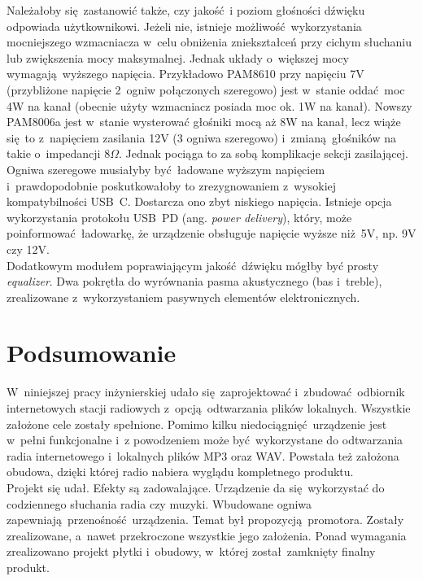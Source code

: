 \documentclass[polish]{aghengthesis}
\begin{document}
			Należałoby się zastanowić także, czy jakość i poziom głośności dźwięku odpowiada użytkownikowi. Jeżeli nie, istnieje możliwość wykorzystania mocniejszego wzmacniacza w~celu obniżenia zniekształceń przy cichym słuchaniu lub zwiększenia mocy maksymalnej. Jednak układy o~większej mocy wymagają wyższego napięcia.
			Przykładowo PAM8610\textsuperscript{\cite{ch5_pam8610}} przy napięciu 7V (przybliżone napięcie 2~ogniw połączonych szeregowo) jest w~stanie oddać moc 4W na kanał (obecnie użyty wzmacniacz posiada moc ok. 1W na kanał). Nowszy PAM8006a\textsuperscript{\cite{ch5_pam8006a}} jest w~stanie wysterować głośniki mocą aż 8W na kanał, lecz wiąże się to z~napięciem zasilania 12V (3 ogniwa szeregowo) i~zmianą głośników na takie o~impedancji $8 \Omega$.
			Jednak pociąga to za sobą komplikacje sekcji zasilającej. Ogniwa szeregowe musiałyby być ładowane wyższym napięciem i~prawdopodobnie poskutkowałoby to zrezygnowaniem z~wysokiej kompatybilności USB~C. Dostarcza ono zbyt niskiego napięcia. Istnieje opcja wykorzystania protokołu USB~PD (ang. \textit{power delivery}), który, może poinformować ładowarkę, że urządzenie obsługuje napięcie wyższe niż 5V, np. 9V czy 12V.
			$ $\\
			
			Dodatkowym modułem poprawiającym jakość dźwięku mógłby być prosty \textit{equalizer}. Dwa pokrętła do wyrównania pasma akustycznego (bas i~treble), zrealizowane z~wykorzystaniem pasywnych elementów elektronicznych.
			
	\section{Podsumowanie}
	
		W~niniejszej pracy inżynierskiej udało się zaprojektować i~zbudować odbiornik internetowych stacji radiowych z~opcją odtwarzania plików lokalnych.
		Wszystkie założone cele zostały spełnione. Pomimo kilku niedociągnięć urządzenie jest w~pełni funkcjonalne i~z powodzeniem może być wykorzystane do odtwarzania radia internetowego i~lokalnych plików MP3 oraz WAV. Powstała też założona obudowa, dzięki której radio nabiera wyglądu kompletnego produktu.
		$ $\\
		
		Projekt się udał. Efekty są zadowalające. Urządzenie da się wykorzystać do codziennego słuchania radia czy muzyki. Wbudowane ogniwa zapewniają przenośność urządzenia.
		Temat był propozycją promotora.
		Zostały zrealizowane, a~nawet przekroczone wszystkie jego założenia. Ponad wymagania zrealizowano projekt płytki i~obudowy, w~której został zamknięty finalny produkt.
		$ $\\
		
\end{document}
